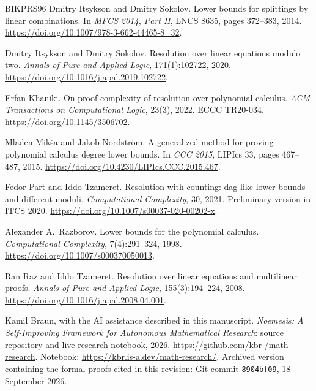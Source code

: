 \begin{thebibliography}{BIKPRS96}
Dmitry Itsykson and Dmitry Sokolov.
\newblock Lower bounds for splittings by linear combinations.
\newblock In \emph{MFCS 2014, Part II}, LNCS 8635,
pages 372--383, 2014.
\newblock \url{https://doi.org/10.1007/978-3-662-44465-8_32}.

Dmitry Itsykson and Dmitry Sokolov.
\newblock Resolution over linear equations modulo two.
\newblock \emph{Annals of Pure and Applied Logic}, 171(1):102722, 2020.
\newblock \url{https://doi.org/10.1016/j.apal.2019.102722}.

Erfan Khaniki.
\newblock On proof complexity of resolution over polynomial calculus.
\newblock \emph{ACM Transactions on Computational Logic}, 23(3), 2022.
ECCC TR20-034.
\newblock \url{https://doi.org/10.1145/3506702}.

Mladen Mik\v{s}a and Jakob Nordstr\"om.
\newblock A generalized method for proving polynomial calculus degree lower
bounds.
\newblock In \emph{CCC 2015}, LIPIcs 33, pages 467--487, 2015.
\newblock \url{https://doi.org/10.4230/LIPIcs.CCC.2015.467}.

Fedor Part and Iddo Tzameret.
\newblock Resolution with counting: dag-like lower bounds and different moduli.
\newblock \emph{Computational Complexity}, 30, 2021.
Preliminary version in ITCS 2020.
\newblock \url{https://doi.org/10.1007/s00037-020-00202-x}.

Alexander A.~Razborov.
\newblock Lower bounds for the polynomial calculus.
\newblock \emph{Computational Complexity}, 7(4):291--324, 1998.
\newblock \url{https://doi.org/10.1007/s000370050013}.

Ran Raz and Iddo Tzameret.
\newblock Resolution over linear equations and multilinear proofs.
\newblock \emph{Annals of Pure and Applied Logic}, 155(3):194--224, 2008.
\newblock \url{https://doi.org/10.1016/j.apal.2008.04.001}.

Kamil Braun, with the AI assistance described in this manuscript.
\newblock \emph{Noemesis: A Self-Improving Framework for Autonomous Mathematical
Research}: source repository and live research notebook, 2026.
\newblock \url{https://github.com/kbr-/math-research}.
\newblock Notebook: \url{https://kbr.is-a.dev/math-research/}.
\newblock Archived version containing the formal proofs cited in this revision:
Git commit \href{https://github.com/kbr-/math-research/tree/8904bf09a5376f48a00d1c25d079bf0c6441502a}
{\texttt{8904bf09}}, 18 September 2026.

\end{thebibliography}
